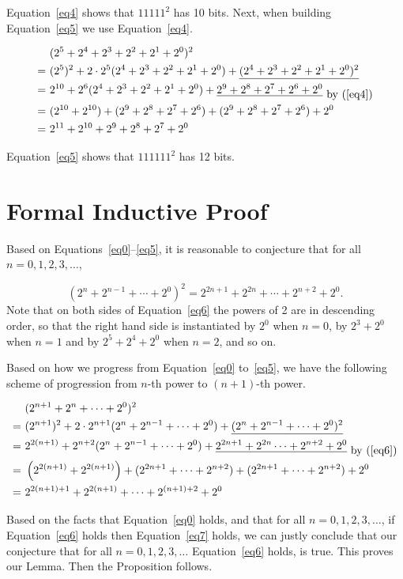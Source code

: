 \documentclass{article}
\begin{document}
Equation~\ref{eq4} shows that $11111^2$ has 10 bits. Next, when building Equation~\ref{eq5} we use Equation~\ref{eq4}.


\begin{equation} \label{eq5}
  \begin{split}
    & (2^5+2^4+2^3+2^2+2^1+2^0)^2\\
   =\ & (2^5)^2+2\cdot2^5(2^4+2^3+2^2+2^1+2^0)+\underline{(2^4+2^3+2^2+2^1+2^0)^2}\\
   =\ & 2^{10}+2^6(2^4+2^3+2^2+2^1+2^0)+\underline{2^9+2^8+2^7+2^6+2^0}_{\mbox{ by (\protect\ref{eq4})}}\\
   =\ & (2^{10}+2^{10})+(2^9+2^8+2^7+2^6)+(2^9+2^8+2^7+2^6)+2^0\\
   =\ & 2^{11}+2^{10}+2^9+2^8+2^7+2^0
  \end{split}
\end{equation}

Equation~\ref{eq5} shows that $111111^2$ has 12 bits.

\section{Formal Inductive Proof}

Based on Equations~\ref{eq0}--\ref{eq5}, it is reasonable to conjecture that for all $n=0,1,2,3,\ldots$,

\begin{equation} \label{eq6}
  (2^n+2^{n-1}+\cdots+2^0)^2=2^{2n+1}+2^{2n}+\cdots+2^{n+2}+2^0.
\end{equation}  
Note that on both sides of Equation~\ref{eq6} the powers of 2 are in descending order, so that the right hand side is instantiated by $2^0$ when $n=0$, by $2^3+2^0$ when $n=1$ and by $2^5+2^4+2^0$ when $n=2$, and so on.

Based on how we progress from Equation~\ref{eq0} to~\ref{eq5}, we have the following scheme of progression from $n$-th power to $(n+1)$-th power.

\begin{equation} \label{eq7}
  \begin{split}
    & (2^{n+1}+2^n+\cdots+2^0)^2\\
   =\ & (2^{n+1})^2+2\cdot2^{n+1}(2^n+2^{n-1}+\cdots+2^0)+\underline{(2^n+2^{n-1}+\cdots+2^0)^2}\\
   =\ & 2^{2(n+1)}+2^{n+2}(2^n+2^{n-1}+\cdots+2^0)+\underline{2^{2n+1}+2^{2n}\cdots+2^{n+2}+2^0}_{\mbox{ by (\protect\ref{eq6})}}\\
   =\ & \left(2^{2(n+1)}+2^{2(n+1)}\right)+(2^{2n+1}+\cdots+2^{n+2})+(2^{2n+1}+\cdots+2^{n+2})+2^0\\
   =\ & 2^{2(n+1)+1}+2^{2(n+1)}+\cdots+2^{(n+1)+2}+2^0
  \end{split}
\end{equation}

Based on the facts that Equation~\ref{eq0} holds, and that for all $n=0,1,2,3,\ldots$, if Equation~\ref{eq6} holds then Equation~\ref{eq7} holds, we can justly conclude that our conjecture that for all $n=0,1,2,3,\ldots$ Equation~\ref{eq6} holds, is true. This proves our Lemma. Then the Proposition follows. 
\end{document}
